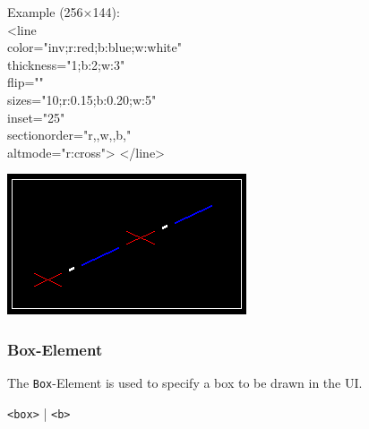 \documentclass[a4paper,11pt]{article}
\begin{document}
\begin{minipage}{0.35\linewidth}
Example (256×144):\\
<line\\color="inv;r:red;b:blue;w:white"\\thickness="1;b:2;w:3"\\flip=""\\sizes="10;r:0.15;b:0.20;w:5"\\inset="25"\\sectionorder="r,,w,,b,"\\altmode="r:cross">
</line>
\end{minipage}
\hfill
\begin{minipage}{0.55\linewidth}
\includegraphics[width=\linewidth]{images/line.png}
\end{minipage}


\newpage
\hypertarget{box}{}
\subsubsection*{Box-Element}
The \texttt{Box}-Element is used to specify a box to be drawn in the UI.
\begin{center}
    \texttt{<box>} | \texttt{<b>}
\end{center}
\end{document}
